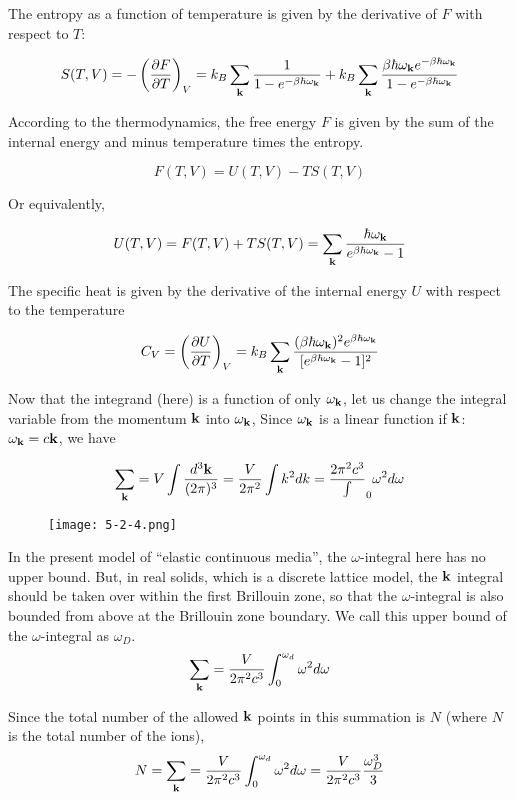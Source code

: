 The entropy as a function of temperature is given by the derivative of $F$ with respect to $T$:

\[S(T,V) = -\left(\frac{\partial F}{\partial T}\right)_V = k_B\sum_{\bf k}\frac{1}{1-e^{-\beta\hbar\omega_{\bf k}}} + k_B\sum_{\bf k}\frac{\beta\hbar\omega_{\bf k}e^{-\beta\hbar\omega_{\bf k}}}{1-e^{-\beta\hbar\omega_{\bf k}}} \]

According to the thermodynamics, the free energy $F$ is given by the sum of the internal energy and minus temperature times the entropy.

\[F(T,V) = U(T,V) - TS(T,V) \]

Or equivalently,

\[U(T,V) = F(T,V) +TS(T,V) = \sum_{\bf k}\frac{\hbar\omega_{\bf k}}{e^{\beta\hbar\omega_{\bf k}} - 1} \]

The specific heat is given by the derivative of the internal energy $U$ with respect to the temperature

\[C_V = \left(\frac{\partial U}{\partial T}\right)_V = k_B\sum_{\bf k}\frac{({\beta\hbar\omega_{\bf k}})^2e^{\beta\hbar\omega_{\bf k}}}{[e^{\beta\hbar\omega_{\bf k}} - 1]^2} \]

Now that the integrand (here) is a function of only $\omega_{\bf k}$, let us change the integral variable from the momentum ${\bf k}$ into $\omega_{\bf k}$, Since $\omega_{\bf k}$ is a linear function if $\bf k$: $\omega_{\bf k} = c\bf k$, we have

\[\sum_{\bf k} = V\int\frac{d^3\bf k}{(2\pi)^3} = \frac{V}{2\pi^2}\int k^2dk = \frac{2\pi^2c^3}\int_0 \omega^2d\omega \]

\begin{wrapfigure}{l}{6cm}
\texttt{[image: 5-2-4.png]}
\end{wrapfigure}In the present model of ``elastic continuous media'', the $\omega$-integral here has no upper bound. But, in real solids, which is a discrete lattice model, the $\bf k$ integral should be taken over within the first Brillouin zone, so that the $\omega$-integral is also bounded from above at the Brillouin zone boundary. We call this upper bound of the $\omega$-integral as $\omega_D$.
\[\sum_{\bf k} = \frac{V}{2\pi^2c^3}\int_0^{\omega_d}\omega^2d\omega \]

Since the total number of the allowed $\bf k$ points in this summation is $N$ (where $N$ is the total number of the ions),
\[N = \sum_{\bf k} = \frac{V}{2\pi^2c^3}\int_0^{\omega_d}\omega^2d\omega = \frac{V}{2\pi^2c^3}\frac{\omega_D^3}{3} \]

